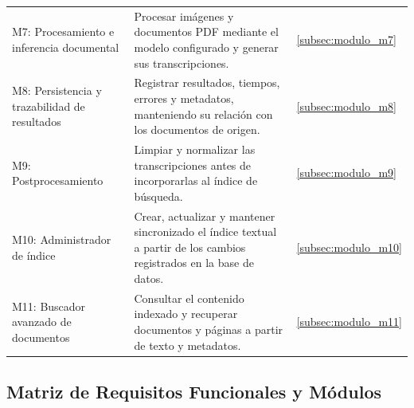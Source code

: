 \begin{table}[H]
\begin{tabularx}{\textwidth}{
        >{\raggedright\arraybackslash}p{}
        >{\raggedright\arraybackslash}X
        >{\centering\arraybackslash}p{}
    }
        M7: Procesamiento e inferencia documental &
        Procesar imágenes y documentos PDF mediante el modelo configurado y generar sus transcripciones. &
        \ref{subsec:modulo_m7} \\

        M8: Persistencia y trazabilidad de resultados &
        Registrar resultados, tiempos, errores y metadatos, manteniendo su relación con los documentos de origen. &
        \ref{subsec:modulo_m8} \\

        M9: Postprocesamiento &
        Limpiar y normalizar las transcripciones antes de incorporarlas al índice de búsqueda. &
        \ref{subsec:modulo_m9} \\

        M10: Administrador de índice &
        Crear, actualizar y mantener sincronizado el índice textual a partir de los cambios registrados en la base de datos. &
        \ref{subsec:modulo_m10} \\

        M11: Buscador avanzado de documentos &
        Consultar el contenido indexado y recuperar documentos y páginas a partir de texto y metadatos. &
        \ref{subsec:modulo_m11} \\

        \bottomrule
    \end{tabularx}
\end{table}


\subsection{Matriz de Requisitos Funcionales y Módulos}
\label{subsec:matriz_requisitos_modulos}

